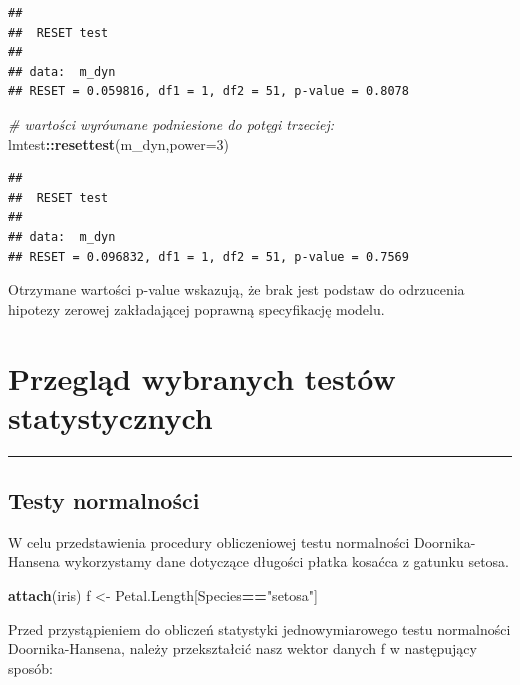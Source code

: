 \documentclass[polish,]{book}
\newenvironment{Shaded}{\begin{snugshade}}{\end{snugshade}}
\newcommand{\CommentTok}[1]{\textcolor[rgb]{0.56,0.35,0.01}{\textit{#1}}}
\newcommand{\DataTypeTok}[1]{\textcolor[rgb]{0.13,0.29,0.53}{#1}}
\newcommand{\DecValTok}[1]{\textcolor[rgb]{0.00,0.00,0.81}{#1}}
\newcommand{\KeywordTok}[1]{\textcolor[rgb]{0.13,0.29,0.53}{\textbf{#1}}}
\newcommand{\NormalTok}[1]{#1}
\newcommand{\OperatorTok}[1]{\textcolor[rgb]{0.81,0.36,0.00}{\textbf{#1}}}
\newcommand{\StringTok}[1]{\textcolor[rgb]{0.31,0.60,0.02}{#1}}
\begin{document}
\begin{verbatim}
## 
##  RESET test
## 
## data:  m_dyn
## RESET = 0.059816, df1 = 1, df2 = 51, p-value = 0.8078
\end{verbatim}

\begin{Shaded}
\begin{Highlighting}[]
\CommentTok{# wartości wyrównane podniesione do potęgi trzeciej:}
\NormalTok{lmtest}\OperatorTok{::}\KeywordTok{resettest}\NormalTok{(m_dyn,}\DataTypeTok{power=}\DecValTok{3}\NormalTok{)}
\end{Highlighting}
\end{Shaded}

\begin{verbatim}
## 
##  RESET test
## 
## data:  m_dyn
## RESET = 0.096832, df1 = 1, df2 = 51, p-value = 0.7569
\end{verbatim}

Otrzymane wartości p-value wskazują, że brak jest podstaw do odrzucenia hipotezy
zerowej zakładającej poprawną specyfikację modelu.

\hypertarget{part_11}{%
\chapter{Przegląd wybranych testów statystycznych}\label{part_11}}

\begin{center}\rule{0.5\linewidth}{\linethickness}\end{center}

\hypertarget{part_11.1}{%
\section{Testy normalności}\label{part_11.1}}

W celu przedstawienia procedury obliczeniowej testu normalności Doornika-Hansena
wykorzystamy dane dotyczące długości płatka kosaćca z gatunku setosa.

\begin{Shaded}
\begin{Highlighting}[]
\KeywordTok{attach}\NormalTok{(iris)}
\NormalTok{f <-}\StringTok{  }\NormalTok{Petal.Length[Species}\OperatorTok{==}\StringTok{"setosa"}\NormalTok{]}
\end{Highlighting}
\end{Shaded}

Przed przystąpieniem do obliczeń statystyki jednowymiarowego testu normalności Doornika-Hansena, należy przekształcić nasz wektor danych f w następujący
sposób:
\end{document}

